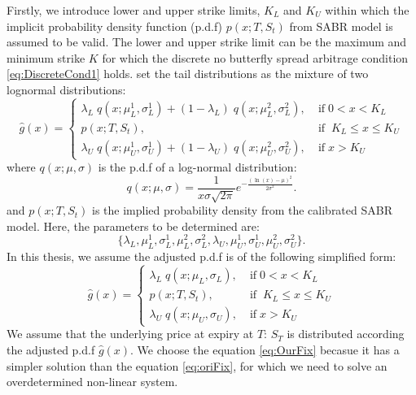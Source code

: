 \documentclass[letterpaper,12pt,titlepage,oneside,final]{book}
\numberwithin{equation}{section}
\theoremstyle{definition}
\begin{document}
Firstly, we introduce lower and upper strike limits, $K_{L}$ and $K_{U}$ within which the implicit probability density function (p.d.f) $p(x;T,S_t)$ from SABR model is assumed to be valid. The lower and upper strike limit can be the maximum and minimum strike $K$ for which the  discrete no butterfly spread arbitrage condition \eqref{eq:DiscreteCond1} holds. \citet{brunner2003arbitrage}  set the tail distributions as the mixture of two lognormal distributions:
\begin{equation}
\hat{g}(x)=\left\{ \begin{array}{ll }
\lambda_{L} \;  q(x;\mu^1_{L},\sigma^1_{L})+(1-\lambda_{L}) \;  q(x;\mu^2_{L},\sigma^2_{L}), \;&  \text{if} \; 0<x< K_{L}\\
p(x;T,S_t) , \;&  \text{if} \; \;  K_{L} \leq x \leq K_{U}\\
\lambda_{U} \;  q(x;\mu^1_{U},\sigma^1_{U})+(1-\lambda_{U}) \;  q(x;\mu^2_{U},\sigma^2_{U}), \;& \text{if} \; x> K_{U}
\end{array} \right.
\label{eq:oriFix}
\end{equation}
where  $q(x;\mu,\sigma)$ is the p.d.f of a  log-normal distribution:
\[
	q(x;\mu,\sigma)=\frac{1}{x\sigma \sqrt{2 \pi}}
	e^{-\frac{(\ln(x)-\mu)^2}{2 \sigma^2}}.
\]
and $p(x;T,S_t)$ is the implied probability density from the calibrated SABR model.  Here, the parameters to be determined are:\[
	\{\lambda_{L}, \mu^1_{L},\sigma^1_{L},\mu^2_{L},\sigma^2_{L},
\lambda_{U}, \mu^1_{U},\sigma^1_{U},\mu^2_{U},\sigma^2_{U}	\}.
\]
In this thesis, we assume the adjusted p.d.f is of the following simplified form:
\begin{equation}
\hat{g}(x)=\left\{ \begin{array}{ll }
\lambda_{L} \;  q(x;\mu_{L},\sigma_{L}), \;&  \text{if} \; 0<x< K_{L}\\
p(x;T,S_t) , \;&  \text{if} \; \;  K_{L} \leq x \leq K_{U}\\
\lambda_{U} \;  q(x;\mu_{U},\sigma_{U}), \;& \text{if} \; x> K_{U}
\end{array} \right.
\label{eq:OurFix}
\end{equation}
We assume that the underlying price at expiry at $T$: $S_T$ is distributed according the adjusted p.d.f $\hat{g}(x)$.
We choose the equation \eqref{eq:OurFix} becasue it has a simpler solution than the equation \eqref{eq:oriFix}, for which we need to solve an overdetermined non-linear system.
\end{document}
